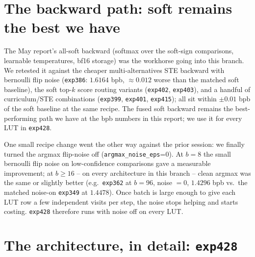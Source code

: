 \documentclass[11pt]{article}
\begin{document}
\section{The backward path: soft remains the best we have}
\label{sec:bwd}

The May report's all-soft backward (softmax over the soft-sign comparisons, learnable temperatures, bf16 storage) was the workhorse going into this branch.
We retested it against the cheaper multi-alternatives STE backward with bernoulli flip noise (\texttt{exp386}: $1.6164$ bpb, $\approx 0.012$ worse than the matched soft baseline), the soft top-$k$ score routing variants (\texttt{exp402}, \texttt{exp403}), and a handful of curriculum/STE combinations (\texttt{exp399}, \texttt{exp401}, \texttt{exp415}); all sit within $\pm 0.01$ bpb of the soft baseline at the same recipe.
The fused soft backward remains the best-performing path we have at the bpb numbers in this report; we use it for every LUT in \texttt{exp428}.

One small recipe change went the other way against the prior session: we finally turned the argmax flip-noise off (\texttt{argmax\_noise\_eps}=0).
At $b{=}8$ the small bernoulli flip noise on low-confidence comparisons gave a measurable improvement; at $b \geq 16$ -- on every architecture in this branch -- clean argmax was the same or slightly better (e.g.\ \texttt{exp362} at $b{=}96$, noise $=0$, $1.4296$ bpb vs.\ the matched noise-on \texttt{exp349} at $1.4478$).
Once batch is large enough to give each LUT row a few independent visits per step, the noise stops helping and starts costing.
\texttt{exp428} therefore runs with noise off on every LUT.

\section{The architecture, in detail: \texttt{exp428}}
\label{sec:arch}
\end{document}
